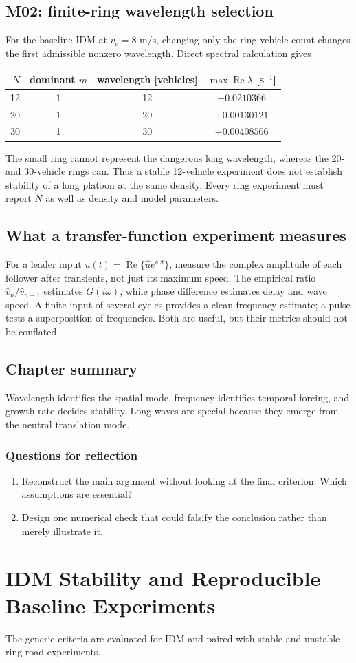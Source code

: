 \documentclass[11pt,a4paper,openany]{book}
\numberwithin{equation}{chapter}
\numberwithin{figure}{chapter}
\numberwithin{table}{chapter}
\newcommand{\chapterguide}[1]{\begin{tcolorbox}[keybox,title=Chapter guide]#1\end{tcolorbox}}
\newcommand{\chapterend}[1]{\section*{Chapter summary}\addcontentsline{toc}{section}{Chapter summary}\begin{tcolorbox}[resultbox]#1\end{tcolorbox}\subsection*{Questions for reflection}\begin{enumerate}[leftmargin=1.7em]\item Reconstruct the main argument without looking at the final criterion. Which assumptions are essential?\item Design one numerical check that could falsify the conclusion rather than merely illustrate it.\end{enumerate}\clearpage}
\newcommand{\Rea}{\operatorname{Re}}
\begin{document}
\section{M02: finite-ring wavelength selection}
For the baseline IDM at $v_e=8$ m/s, changing only the ring vehicle count changes the first admissible nonzero wavelength. Direct spectral calculation gives
\begin{center}
\small
\begin{tabular}{rccc}
\toprule
$N$ & dominant $m$ & wavelength [vehicles] & $\max\Rea\lambda$ [s$^{-1}$]\\
\midrule
12 & 1 & 12 & $-0.0210366$\\
20 & 1 & 20 & $+0.00130121$\\
30 & 1 & 30 & $+0.00408566$\\
\bottomrule
\end{tabular}
\end{center}
The small ring cannot represent the dangerous long wavelength, whereas the 20- and 30-vehicle rings can. Thus a stable 12-vehicle experiment does not establish stability of a long platoon at the same density. Every ring experiment must report $N$ as well as density and model parameters.

\section{What a transfer-function experiment measures}
For a leader input $u(t)=\Rea\{\hat u e^{i\omega t}\}$, measure the complex amplitude of each follower after transients, not just its maximum speed. The empirical ratio $\hat v_n/\hat v_{n-1}$ estimates $G(i\omega)$, while phase difference estimates delay and wave speed. A finite input of several cycles provides a clean frequency estimate; a pulse tests a superposition of frequencies. Both are useful, but their metrics should not be conflated.

\chapterend{Wavelength identifies the spatial mode, frequency identifies temporal forcing, and growth rate decides stability. Long waves are special because they emerge from the neutral translation mode.}

\chapter{IDM Stability and Reproducible Baseline Experiments}
\chapterguide{The generic criteria are evaluated for IDM and paired with stable and unstable ring-road experiments.}
\end{document}
